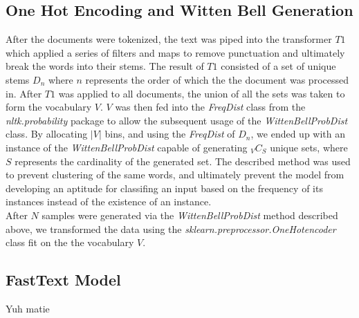 \documentclass[12pt]{report}
\begin{document}
\subsection{One Hot Encoding and Witten Bell Generation} 
After the documents were tokenized, the text was piped into the transformer $T1$ which applied a
series of filters and maps to remove punctuation and ultimately break the words
into their stems. The result of $T1$ consisted of a set of unique stems $D_n$
where $n$ represents the order of which the the document was processed in.
After $T1$ was applied to all documents, the union of all the sets was taken to
form the vocabulary $V$. $V$ was then fed into the \emph{FreqDist} class from
the \emph{nltk.probability} package to allow the subsequent usage of the
\emph{WittenBellProbDist} class. By allocating $|V|$ bins, and using the
\emph{FreqDist} of $D_n$, we ended up with an instance of the
\emph{WittenBellProbDist} capable of generating ${}_{V}C_{S}$ unique sets,
where $S$ represents the cardinality of the generated set. The described method
was used to prevent clustering of the same words, and ultimately prevent the
model from developing an aptitude for classifing an input based on the
frequency of its instances instead of the existence of an instance.\\

After $N$ samples were generated via the \emph{WittenBellProbDist} method
described above, we transformed the data using the
\emph{sklearn.preprocessor.OneHotencoder} class fit on the the vocabulary $V$.

\subsection{FastText Model}
Yuh matie
\end{document}
